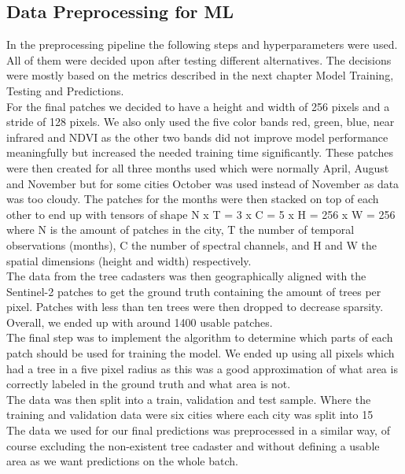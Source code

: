 \subsection{Data Preprocessing for ML}
In the preprocessing pipeline the following steps and hyperparameters were used. All of them were decided upon after testing different alternatives. The decisions were mostly based on the metrics described in the next chapter Model Training, Testing and Predictions.
\\
For the final patches we decided to have a height and width of 256 pixels and a stride of 128 pixels. We also only used the five color bands red, green, blue, near infrared and NDVI as the other two bands did not improve model performance meaningfully but increased the needed training time significantly. These patches were then created for all three months used which were normally April, August and November but for some cities October was used instead of November as data was too cloudy. The patches for the months were then stacked on top of each other to end up with tensors of shape N x T = 3 x C = 5 x H = 256 x W = 256 where N is the amount of patches in the city, T the number of temporal observations (months), C the number of spectral channels, and H and W the spatial dimensions (height and width) respectively.
\\
The data from the tree cadasters was then geographically aligned with the Sentinel-2 patches to get the ground truth containing the amount of trees per pixel. Patches with less than ten trees were then dropped to decrease sparsity. Overall, we ended up with around 1400 usable patches.
\\
The final step was to implement the algorithm to determine which parts of each patch should be used for training the model. We ended up using all pixels which had a tree in a five pixel radius as this was a good approximation of what area is correctly labeled in the ground truth and what area is not. 
\\
The data was then split into a train, validation and test sample. Where the training and validation data were six cities where each city was split into 15%
\\
The data we used for our final predictions was preprocessed in a similar way, of course excluding the non-existent tree cadaster and without defining a usable area as we want predictions on the whole batch. 

